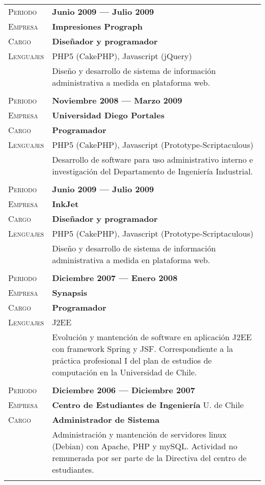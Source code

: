 \documentclass[letterpaper, oneside, final, 12pt]{scrartcl}
\newcommand{\gray}{\rowcolor[gray]{.90}}
\begin{document}
\begin{center}
\begin{tabularx}{0.97\linewidth}{>{\raggedleft\scshape}p{2.5cm}X}
\gray	Periodo		& \textbf{Junio 2009 --- Julio 2009} \\
\gray	Empresa		& \textbf{Impresiones Prograph} \\
\gray	Cargo		& \textbf{Dise\~nador y programador} \\
\gray	Lenguajes	& PHP5 (CakePHP), Javascript (jQuery)\\
					& Dise\~no y desarrollo de sistema de informaci\'on administrativa a medida en plataforma web. \\
					& \\
\gray	Periodo		& \textbf{Noviembre 2008 --- Marzo 2009} \\
\gray	Empresa		& \textbf{Universidad Diego Portales} \\
\gray	Cargo		& \textbf{Programador} \\
\gray	Lenguajes	& PHP5 (CakePHP), Javascript (Prototype-Scriptaculous) \\
					& Desarrollo de software para uso administrativo interno e investigaci\'on del Departamento de Ingeniería Industrial. \\
					& \\
\gray	Periodo		& \textbf{Junio 2009 --- Julio 2009} \\
\gray	Empresa		& \textbf{InkJet} \\
\gray	Cargo		& \textbf{Dise\~nador y programador} \\
\gray	Lenguajes	& PHP5 (CakePHP), Javascript (Prototype-Scriptaculous)\\
					& Dise\~no y desarrollo de sistema de informaci\'on administrativa a medida en plataforma web. \\
					& \\
\gray	Periodo		& \textbf{Diciembre 2007 --- Enero 2008} \\
\gray	Empresa		& \textbf{Synapsis} \\
\gray	Cargo		& \textbf{Programador} \\
\gray	Lenguajes	& J2EE \\
					& Evoluci\'on y mantenci\'on de software en aplicaci\'on J2EE con framework Spring y JSF. Correspondiente a la pr\'actica profesional I del plan de estudios de computaci\'on en la Universidad de Chile. \\
					& \\
\gray	Periodo		& \textbf{Diciembre 2006 --- Diciembre 2007} \\
\gray	Empresa		& \textbf{Centro de Estudiantes de Ingenier\'ia} \hfill U. de Chile \\
\gray	Cargo		& \textbf{Administrador de Sistema} \\
					& Administraci\'on y mantenci\'on de servidores linux (Debian) con Apache, PHP y mySQL. Actividad no remunerada por ser parte de la Directiva del centro de estudiantes.\\
					& \\
\end{tabularx}


\end{center}
\end{document}
